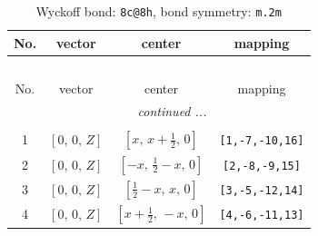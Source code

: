 \documentclass[fleqn,8pt]{jsarticle}
\begin{document}
\renewcommand{\arraystretch}{1.2}
\begin{longtable}{cccc}
\caption{Wyckoff bond: {\tt 8c@8h}, bond symmetry: {\tt m.2m}}
 \\
 \hline \hline
No. & vector & center & mapping \\ \hline \endfirsthead

\multicolumn{3}{l}{\tablename\ \thetable{}} \\
 \hline \hline
No. & vector & center & mapping \\ \hline \endhead

 \hline \hline
\multicolumn{3}{r}{\footnotesize\it continued ...} \\ \endfoot

 \hline \hline
\multicolumn{3}{r}{} \\ \endlastfoot

1 & $\left[ 0,\, 0,\, Z \right]$ & $\left[ x,\, x + \frac{1}{2},\, 0 \right]$ & {\tt [1,-7,-10,16]} \\ \hline
2 & $\left[ 0,\, 0,\, Z \right]$ & $\left[ - x,\, \frac{1}{2} - x,\, 0 \right]$ & {\tt [2,-8,-9,15]} \\ \hline
3 & $\left[ 0,\, 0,\, Z \right]$ & $\left[ \frac{1}{2} - x,\, x,\, 0 \right]$ & {\tt [3,-5,-12,14]} \\ \hline
4 & $\left[ 0,\, 0,\, Z \right]$ & $\left[ x + \frac{1}{2},\, - x,\, 0 \right]$ & {\tt [4,-6,-11,13]} \\
\end{longtable}
\renewcommand{\arraystretch}{1.2}
\end{document}
